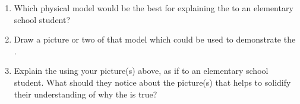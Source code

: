 \begin{enumerate}
    \item Which physical model would be the best for explaining the \textbf{} to an elementary school student?
    
    \vspace{50pt}

    \item Draw a picture or two of that model which could be used to demonstrate the .
    
    \vspace{120pt}

    \item Explain the  using your picture(s) above, as if to an elementary school student. What should they notice about the picture(s) that helps to solidify their understanding of why the  is true?
    
    \vfill
\end{enumerate}


